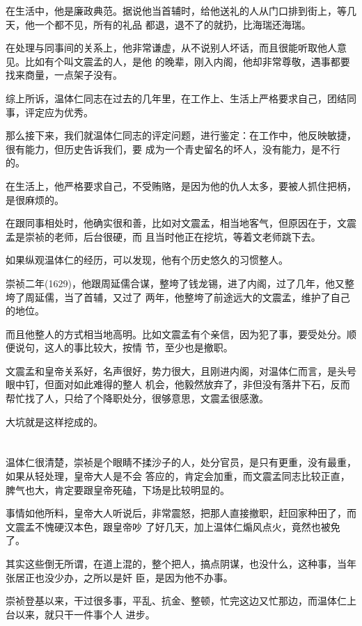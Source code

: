 \documentclass[11pt,a4paper,onecolumn]{article}
\begin{document}
在生活中，他是廉政典范。据说他当首辅时，给他送礼的人从门口排到街上，等几天，他一个都不见，所有的礼品
都退，退不了的就扔，比海瑞还海瑞。

在处理与同事间的关系上，他非常谦虚，从不说别人坏话，而且很能听取他人意见。比如有个叫文震孟的人，是他
的晚辈，刚入内阁，他却非常尊敬，遇事都要找来商量，一点架子没有。

综上所诉，温体仁同志在过去的几年里，在工作上、生活上严格要求自己，团结同事，评定应为优秀。

那么接下来，我们就温体仁同志的评定问题，进行鉴定：在工作中，他反映敏捷，很有能力，但历史告诉我们，要
成为一个青史留名的坏人，没有能力，是不行的。

在生活上，他严格要求自己，不受贿赂，是因为他的仇人太多，要被人抓住把柄，是很麻烦的。

在跟同事相处时，他确实很和善，比如对文震孟，相当地客气，但原因在于，文震孟是崇祯的老师，后台很硬，而
且当时他正在挖坑，等着文老师跳下去。

如果纵观温体仁的经历，可以发现，他有个历史悠久的习惯\myrule 整人。

崇祯二年(1629)，他跟周延儒合谋，整垮了钱龙锡，进了内阁，过了几年，他又整垮了周延儒，当了首辅，又过了
两年，他整垮了前途远大的文震孟，维护了自己的地位。

而且他整人的方式相当地高明。比如文震孟有个亲信，因为犯了事，要受处分。顺便说句，这人的事比较大，按情
节，至少也是撤职。

文震孟和皇帝关系好，名声很好，势力很大，且刚进内阁，对温体仁而言，是头号眼中钉，但面对如此难得的整人
机会，他毅然放弃了，非但没有落井下石，反而帮忙找了人，只给了个降职处分，很够意思，文震孟很感激。

大坑就是这样挖成的。

\section[\thesection]{}

温体仁很清楚，崇祯是个眼睛不揉沙子的人，处分官员，是只有更重，没有最重，如果从轻处理，皇帝大人是不会
答应的，肯定会加重，而文震孟同志比较正直，脾气也大，肯定要跟皇帝死磕，下场是比较明显的。

事情如他所料，皇帝大人听说后，非常震怒，把那人直接撤职，赶回家种田了，而文震孟不愧硬汉本色，跟皇帝吵
了好几天，加上温体仁煽风点火，竟然也被免了。

其实这些倒无所谓，在道上混的，整个把人，搞点阴谋，也没什么，这种事，当年张居正也没少办，之所以是奸
臣，是因为他不办事。

崇祯登基以来，干过很多事，平乱、抗金、整顿，忙完这边又忙那边，而温体仁上台以来，就只干一件事\myrule 个人
进步。
\end{document}
